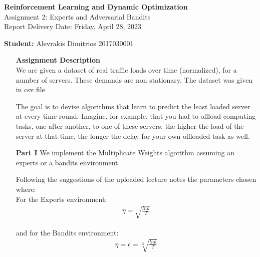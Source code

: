 \documentclass[12pt]{article}
\begin{document}
	\begin{center}
		{\bf Reinforcement Learning and Dynamic Optimization} \\
		Assignment 2: Experts and Adversarial Bandits\\%
		Report Delivery Date: Friday, April 28, 2023 \\
	\end{center}
	{\bf Student: }Alevrakis Dimitrios 2017030001\\
	
	\begin{enumerate}
		\item []{\bf Assignment Description} \\
		We are given a dataset of real traffic loads over time (normalized), for a number of servers. These demands are non stationary. The dataset was given in csv file
		
		The goal is to devise algorithms that learn to predict the least loaded server at every time round. Imagine, for example, that you had to offload computing tasks, one after another, to one of these servers: the higher the load of the server at that time, the longer the delay for your own offloaded task as well.
		
		\item[{\bf Part I}]
		We implement the Multiplicate Weights algorithm assuming an experts or a bandits environment.
		
		Following the suggestions of the uploaded lecture notes the parameters chosen where:\\
		For the Experts environment:
		\begin{align}
			\eta = \sqrt{\frac{lnk}{T}}
		\end{align}
		
		and for the Bandits environment:
		\begin{align}
			\eta = \epsilon = \sqrt[3]{\frac{lnk}{T}}
		\end{align}
		

\end{enumerate}
\end{document}
